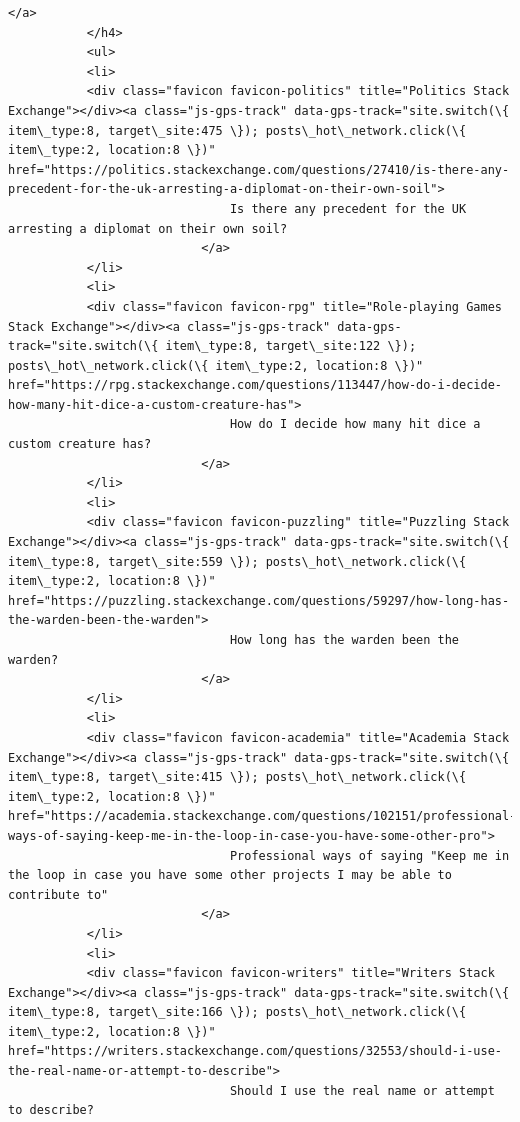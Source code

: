 \documentclass[11pt]{article}
\begin{document}
\begin{Verbatim}[commandchars=\\\{\}]
                   </a>
           </h4>
           <ul>
           <li>
           <div class="favicon favicon-politics" title="Politics Stack Exchange"></div><a class="js-gps-track" data-gps-track="site.switch(\{ item\_type:8, target\_site:475 \}); posts\_hot\_network.click(\{ item\_type:2, location:8 \})" href="https://politics.stackexchange.com/questions/27410/is-there-any-precedent-for-the-uk-arresting-a-diplomat-on-their-own-soil">
                               Is there any precedent for the UK arresting a diplomat on their own soil?
                           </a>
           </li>
           <li>
           <div class="favicon favicon-rpg" title="Role-playing Games Stack Exchange"></div><a class="js-gps-track" data-gps-track="site.switch(\{ item\_type:8, target\_site:122 \}); posts\_hot\_network.click(\{ item\_type:2, location:8 \})" href="https://rpg.stackexchange.com/questions/113447/how-do-i-decide-how-many-hit-dice-a-custom-creature-has">
                               How do I decide how many hit dice a custom creature has?
                           </a>
           </li>
           <li>
           <div class="favicon favicon-puzzling" title="Puzzling Stack Exchange"></div><a class="js-gps-track" data-gps-track="site.switch(\{ item\_type:8, target\_site:559 \}); posts\_hot\_network.click(\{ item\_type:2, location:8 \})" href="https://puzzling.stackexchange.com/questions/59297/how-long-has-the-warden-been-the-warden">
                               How long has the warden been the warden?
                           </a>
           </li>
           <li>
           <div class="favicon favicon-academia" title="Academia Stack Exchange"></div><a class="js-gps-track" data-gps-track="site.switch(\{ item\_type:8, target\_site:415 \}); posts\_hot\_network.click(\{ item\_type:2, location:8 \})" href="https://academia.stackexchange.com/questions/102151/professional-ways-of-saying-keep-me-in-the-loop-in-case-you-have-some-other-pro">
                               Professional ways of saying "Keep me in the loop in case you have some other projects I may be able to contribute to"
                           </a>
           </li>
           <li>
           <div class="favicon favicon-writers" title="Writers Stack Exchange"></div><a class="js-gps-track" data-gps-track="site.switch(\{ item\_type:8, target\_site:166 \}); posts\_hot\_network.click(\{ item\_type:2, location:8 \})" href="https://writers.stackexchange.com/questions/32553/should-i-use-the-real-name-or-attempt-to-describe">
                               Should I use the real name or attempt to describe?

\end{Verbatim}
\end{document}
